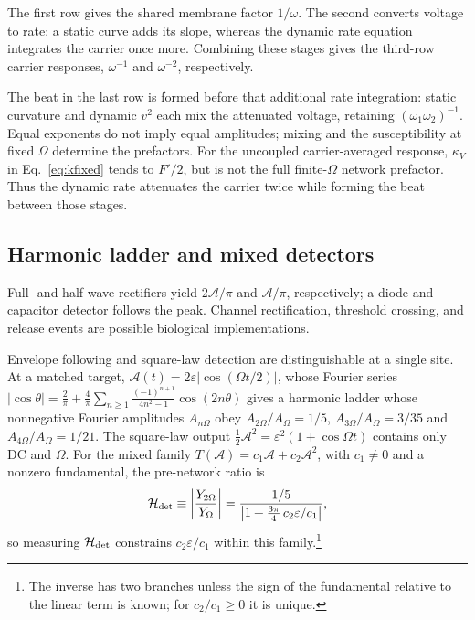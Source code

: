 \documentclass[11pt,a4paper]{article}
\newif\ifjne
\newcommand{\half}{\tfrac{1}{2}}
\providecommand{\DIFaddtex}[1]{{\protect\color{blue} \sf #1}} %
\providecommand{\DIFaddbegin}{} %
\providecommand{\DIFaddend}{} %
\providecommand{\DIFadd}[1]{\texorpdfstring{\DIFaddtex{#1}}{#1}} %
\begin{document}
The first row gives the shared membrane factor $1/\omega$. The second converts
voltage to rate: a static curve adds its slope, whereas the dynamic rate equation
integrates the carrier once more. Combining these stages gives the third-row
carrier responses, $\omega^{-1}$ and $\omega^{-2}$, respectively.

The beat in the last row is formed before that additional rate integration:
static curvature and dynamic $v^2$ each mix the attenuated voltage, retaining
$(\omega_1\omega_2)^{-1}$. Equal exponents do not imply equal amplitudes; mixing
and the susceptibility at fixed $\Omega$ determine the prefactors. For the
uncoupled carrier-averaged response, $\kappa_V$ in Eq.~\eqref{eq:kfixed} tends to
$F'/2$, but is not the full finite-$\Omega$ network prefactor. Thus the dynamic
rate attenuates the carrier twice while forming the beat between those stages.

\ifjne
\subsection{Harmonic ladder and mixed detectors}\label{supp:harmonics}
\DIFaddbegin \DIFadd{Full- and half-wave rectifiers yield $2\mathcal A/\pi$ and
$\mathcal A/\pi$, respectively; a diode-and-capacitor detector follows the
peak. Channel rectification, threshold crossing, and release events are
possible biological implementations.
}

\DIFaddend Envelope following and square-law detection are distinguishable at a single site. At a matched target,
$\mathcal A(t)=2\varepsilon|\cos(\Omega t/2)|$, whose Fourier series
$|\cos\theta|=\tfrac2\pi+\tfrac4\pi\sum_{n\ge1}\tfrac{(-1)^{n+1}}{4n^2-1}\cos(2n\theta)$ gives a
harmonic ladder whose nonnegative Fourier amplitudes $A_{n\Omega}$ obey $A_{2\Omega}/A_\Omega=1/5$, $A_{3\Omega}/A_\Omega=3/35$ and
$A_{4\Omega}/A_\Omega=1/21$. The square-law output $\half \mathcal A^2=\varepsilon^2(1+\cos\Omega
t)$ contains only DC and $\Omega$. For the mixed family $T(\mathcal A)=c_1\mathcal A+c_2\mathcal A^2$, with
$c_1\ne0$ and a nonzero fundamental, the
pre-network ratio is
\begin{equation}
\mathcal H_{\rm det}\equiv\left|\frac{Y_{2\Omega}}{Y_\Omega}\right|
=\frac{1/5}{\left|1+\tfrac{3\pi}{4}\,c_2\varepsilon/c_1\right|},
\label{eq:rdet}
\end{equation}
so measuring $\mathcal H_{\rm det}$ constrains $c_2\varepsilon/c_1$ within this family.\footnote{The inverse has two branches unless the sign of the fundamental
relative to the linear term is known; for $c_2/c_1\ge0$ it is unique.}
\end{document}
